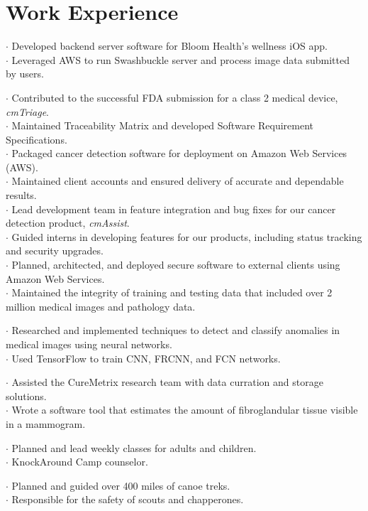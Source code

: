 \section{Work Experience}

$\cdot$ Developed backend server software for Bloom Health's wellness iOS app.\\
$\cdot$ Leveraged AWS to run Swashbuckle server and process image data submitted by users.

$\cdot$ Contributed to the successful FDA submission for a class 2 medical device, {\it cmTriage}.\\
$\cdot$ Maintained Traceability Matrix and developed Software Requirement Specifications.\\
$\cdot$ Packaged cancer detection software for deployment on Amazon Web Services (AWS).\\
$\cdot$ Maintained client accounts and ensured delivery of accurate and dependable results.\\
$\cdot$ Lead development team in feature integration and bug fixes for our cancer detection product, {\it cmAssist}.\\
$\cdot$ Guided interns in developing features for our products, including status tracking and security upgrades.\\
$\cdot$ Planned, architected, and deployed secure software to external clients using Amazon Web Services.\\
$\cdot$ Maintained the integrity of training and testing data that included over 2 million medical images and pathology data.

$\cdot$ Researched and implemented techniques to detect and classify anomalies in medical images using neural networks.\\
$\cdot$ Used TensorFlow to train CNN, FRCNN, and FCN networks.

$\cdot$ Assisted the CureMetrix research team with data curration and storage solutions.\\
$\cdot$ Wrote a software tool that estimates the amount of fibroglandular tissue visible in a mammogram.

$\cdot$ Planned and lead weekly classes for adults and children.\\
$\cdot$ KnockAround Camp counselor.

$\cdot$ Planned and guided over 400 miles of canoe treks.\\
$\cdot$ Responsible for the safety of scouts and chapperones.
